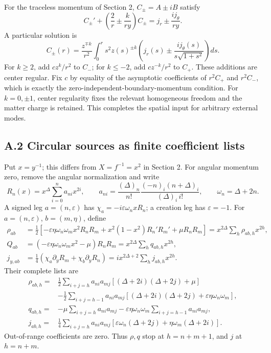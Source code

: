 \documentclass[a4paper,11pt]{article}
\numberwithin{equation}{section}
\begin{document}
For the traceless momentum of Section 2, \(C_\pm=A\pm iB\) satisfy \[
C_\pm'+\left(\frac2r\pm\frac{k}{ry}\right)C_\pm
=j_r\pm\frac{ij_\theta}{ry}.
\tag{A.6}
\] A particular solution is \[
C_\pm(r)=\frac{z^{\mp k}}{r^2}
\int_0^r s^2z(s)^{\pm k}
\left(j_r(s)\pm\frac{ij_\theta(s)}{s\sqrt{1+s^2}}\right)ds .
\tag{A.7}
\] For \(k\ge2\), add \(cz^k/r^2\) to \(C_-\); for \(k\le-2\), add \(cz^{-k}/r^2\) to \(C_+\). These additions are center regular. Fix \(c\) by equality of the asymptotic coefficients of \(r^2C_+\) and \(r^2C_-\), which is exactly the zero-independent-boundary-momentum condition. For \(k=0,\pm1\), center regularity fixes the relevant homogeneous freedom and the matter charge is retained. This completes the spatial input for arbitrary external modes.

\hypertarget{a.2-circular-sources-as-finite-coefficient-lists}{%
\subsection{A.2 Circular sources as finite coefficient lists}\label{a.2-circular-sources-as-finite-coefficient-lists}}

Put \(x=y^{-1}\); this differs from \(X=f^{-1}=x^2\) in Section 2. For angular momentum zero, remove the angular normalization and write \[
R_n(x)=x^\Delta\sum_{i=0}^n a_{ni}x^{2i},\qquad
a_{ni}=\frac{(\Delta)_n}{n!}
\frac{(-n)_i(n+\Delta)_i}{(\Delta)_i\,i!},
\qquad \omega_n=\Delta+2n.
\tag{A.8}
\] A signed leg \(a=(n,\varepsilon)\) has \(\chi_a=-i\varepsilon\omega_nxR_n\); a creation leg has \(\varepsilon=-1\). For \(a=(n,\varepsilon)\), \(b=(m,\eta)\), define \[
\begin{aligned}
\rho_{ab}&=\frac12\left[
-\varepsilon\eta\omega_n\omega_mx^2R_nR_m
+x^2(1-x^2)R_n'R_m'+\mu R_nR_m\right]
=x^{2\Delta}\sum_h\rho_{ab,h}x^{2h},\\
Q_{ab}&=(-\varepsilon\eta\omega_n\omega_mx^2-\mu)R_nR_m
=x^{2\Delta}\sum_hq_{ab,h}x^{2h},\\
j_{y,ab}&=\frac14(\chi_a\partial_yR_m+\chi_b\partial_yR_n)
=ix^{2\Delta+2}\sum_hj_{ab,h}x^{2h}.
\end{aligned}
\tag{A.9}
\] Their complete lists are \[
\begin{aligned}
\rho_{ab,h}={}&\frac12\sum_{i+j=h}a_{ni}a_{mj}
[(\Delta+2i)(\Delta+2j)+\mu]\\
&-\frac12\sum_{i+j=h-1}a_{ni}a_{mj}
[(\Delta+2i)(\Delta+2j)+\varepsilon\eta\omega_n\omega_m],\\
q_{ab,h}={}&-\mu\sum_{i+j=h}a_{ni}a_{mj}
-\varepsilon\eta\omega_n\omega_m\sum_{i+j=h-1}a_{ni}a_{mj},\\
j_{ab,h}={}&\frac14\sum_{i+j=h}a_{ni}a_{mj}
[\varepsilon\omega_n(\Delta+2j)+\eta\omega_m(\Delta+2i)] .
\end{aligned}
\tag{A.10}
\] Out-of-range coefficients are zero. Thus \(\rho,q\) stop at \(h=n+m+1\), and \(j\) at \(h=n+m\).
\end{document}
